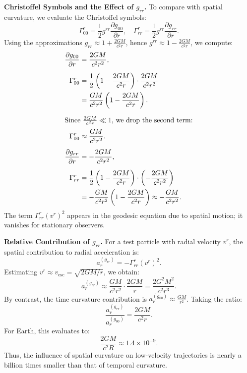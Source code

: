 \begin{technical}
\textbf{Christoffel Symbols and the Effect of \( g_{rr} \).}  
To compare with spatial curvature, we evaluate the Christoffel symbols:
\begin{equation}
\Gamma^r_{00} = \frac{1}{2} g^{rr} \frac{\partial g_{00}}{\partial r}, \quad 
\Gamma^r_{rr} = \frac{1}{2} g^{rr} \frac{\partial g_{rr}}{\partial r}.
\end{equation}
Using the approximations \( g_{rr} \approx 1 + \frac{2GM}{c^2 r} \), hence \( g^{rr} \approx 1 - \frac{2GM}{c^2 r} \), we compute:
\begin{align}
\frac{\partial g_{00}}{\partial r} &= \frac{2GM}{c^2 r^2}, \\[0.5em]
\Gamma^r_{00} &= \frac{1}{2} \left(1 - \frac{2GM}{c^2 r} \right) \cdot \frac{2GM}{c^2 r^2} \notag \\
&= \frac{GM}{c^2 r^2} \left(1 - \frac{2GM}{c^2 r} \right). \\[0.5em]
\intertext{Since \( \frac{2GM}{c^2 r} \ll 1 \), we drop the second term:}
\Gamma^r_{00} &\approx \frac{GM}{c^2 r^2}. \\[0.5em]
\frac{\partial g_{rr}}{\partial r} &= -\frac{2GM}{c^2 r^2}, \\[0.5em]
\Gamma^r_{rr} &= \frac{1}{2} \left(1 - \frac{2GM}{c^2 r} \right) \cdot \left(-\frac{2GM}{c^2 r^2} \right) \notag \\
&= -\frac{GM}{c^2 r^2} \left(1 - \frac{2GM}{c^2 r} \right) \approx -\frac{GM}{c^2 r^2}.
\end{align}
The term \( \Gamma^r_{rr} (v^r)^2 \) appears in the geodesic equation due to spatial motion; it vanishes for stationary observers.


\textbf{Relative Contribution of \( g_{rr} \).}  
For a test particle with radial velocity \( v^r \), the spatial contribution to radial acceleration is:
\begin{equation}
a_r^{(g_{rr})} = -\Gamma^r_{rr} (v^r)^2.
\end{equation}
Estimating \( v^r \approx v_{\text{esc}} = \sqrt{2GM/r} \), we obtain:
\begin{equation}
a_r^{(g_{rr})} \approx \frac{GM}{c^2 r^2} \cdot \frac{2GM}{r} = \frac{2 G^2 M^2}{c^2 r^3}.
\end{equation}
By contrast, the time curvature contribution is \( a_r^{(g_{00})} \approx \frac{GM}{r^2} \). Taking the ratio:
\begin{equation}
\frac{a_r^{(g_{rr})}}{a_r^{(g_{00})}} = \frac{2GM}{c^2 r}.
\end{equation}
For Earth, this evaluates to:
\begin{equation}
\frac{2GM}{c^2 R} \approx 1.4 \times 10^{-9}.
\end{equation}
Thus, the influence of spatial curvature on low-velocity trajectories is nearly a billion times smaller than that of temporal curvature.


\end{technical}

